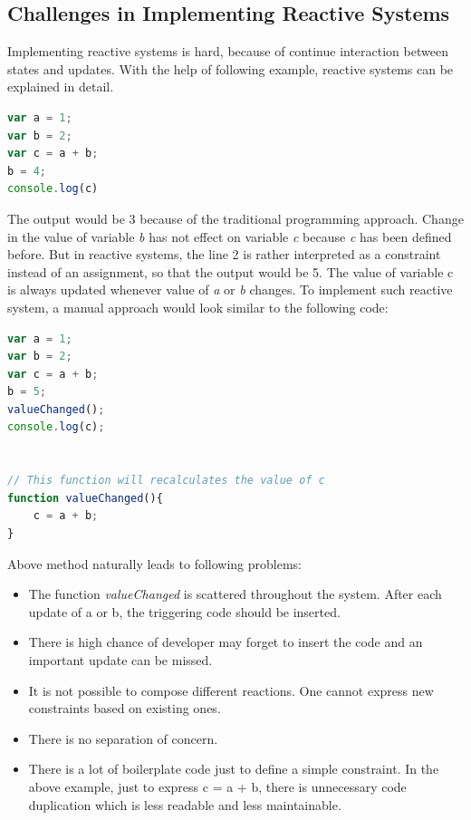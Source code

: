 \subsection {Challenges in Implementing Reactive Systems}
Implementing reactive systems is hard, because of continue interaction between states and updates. With the help of following example, reactive systems can be explained in detail.

\begin{lstlisting}[language=JavaScript, caption=Sample example 1, label={lst:sample-example-1}]
var a = 1;
var b = 2;
var c = a + b;
b = 4;
console.log(c)
\end{lstlisting}
The output would be 3 because of the traditional programming approach. Change in the value of variable \textit{b} has not effect on variable \textit{c} because \textit{c} has been defined before. But in reactive systems, the line 2 is rather interpreted as a constraint instead of an assignment, so that the output would be 5. The value of variable c is always updated whenever value of \textit{a} or \textit{b} changes. 
To implement such reactive system, a manual approach would look similar to the following code:
\begin{lstlisting}[language=JavaScript, caption=Sample example 2, label={lst:sample-example-2}]
var a = 1;
var b = 2;
var c = a + b;
b = 5;
valueChanged();
console.log(c);


// This function will recalculates the value of c
function valueChanged(){
	c = a + b;
}
\end{lstlisting}
Above method naturally leads to following problems:

\begin{itemize}
	
	\item The function \textit{valueChanged} is scattered throughout the system. After each update of a or b, the triggering code should be inserted.
	\item There is high chance of developer may forget to insert the code and an important update can be missed.
	\item It is not possible to compose different reactions. One cannot express new constraints based on existing ones.
	\item There is no separation of concern.
	\item There is a lot of boilerplate code just to define a simple constraint. In the above example, just to express c = a + b, there is unnecessary code duplication which is less readable and less maintainable.
\end{itemize}
	
